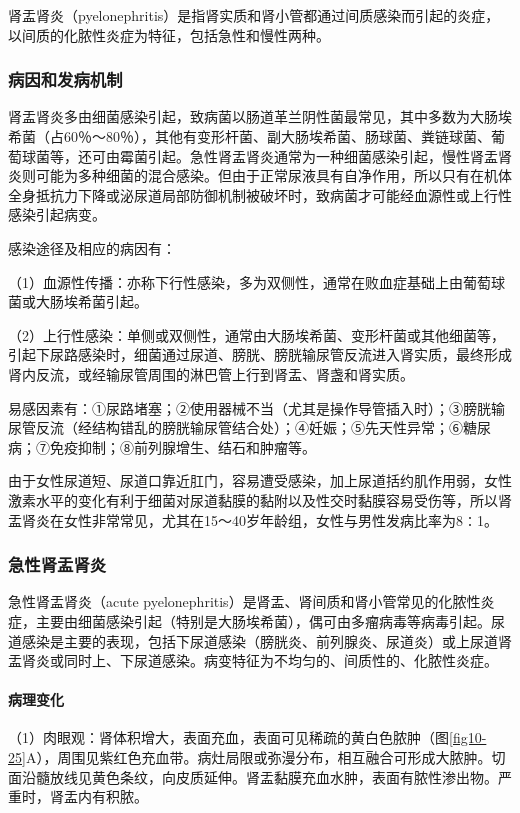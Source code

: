肾盂肾炎（pyelonephritis）是指肾实质和肾小管都通过间质感染而引起的炎症，以间质的化脓性炎症为特征，包括急性和慢性两种。

\subsubsection{病因和发病机制}

肾盂肾炎多由细菌感染引起，致病菌以肠道革兰阴性菌最常见，其中多数为大肠埃希菌（占60％～80％），其他有变形杆菌、副大肠埃希菌、肠球菌、粪链球菌、葡萄球菌等，还可由霉菌引起。急性肾盂肾炎通常为一种细菌感染引起，慢性肾盂肾炎则可能为多种细菌的混合感染。但由于正常尿液具有自净作用，所以只有在机体全身抵抗力下降或泌尿道局部防御机制被破坏时，致病菌才可能经血源性或上行性感染引起病变。

感染途径及相应的病因有：

（1）血源性传播：亦称下行性感染，多为双侧性，通常在败血症基础上由葡萄球菌或大肠埃希菌引起。

（2）上行性感染：单侧或双侧性，通常由大肠埃希菌、变形杆菌或其他细菌等，引起下尿路感染时，细菌通过尿道、膀胱、膀胱输尿管反流进入肾实质，最终形成肾内反流，或经输尿管周围的淋巴管上行到肾盂、肾盏和肾实质。

易感因素有：①尿路堵塞；②使用器械不当（尤其是操作导管插入时）；③膀胱输尿管反流（经结构错乱的膀胱输尿管结合处）；④妊娠；⑤先天性异常；⑥糖尿病；⑦免疫抑制；⑧前列腺增生、结石和肿瘤等。

由于女性尿道短、尿道口靠近肛门，容易遭受感染，加上尿道括约肌作用弱，女性激素水平的变化有利于细菌对尿道黏膜的黏附以及性交时黏膜容易受伤等，所以肾盂肾炎在女性非常常见，尤其在15～40岁年龄组，女性与男性发病比率为8∶1。

\subsubsection{急性肾盂肾炎}

急性肾盂肾炎（acute
pyelonephritis）是肾盂、肾间质和肾小管常见的化脓性炎症，主要由细菌感染引起（特别是大肠埃希菌），偶可由多瘤病毒等病毒引起。尿道感染是主要的表现，包括下尿道感染（膀胱炎、前列腺炎、尿道炎）或上尿道肾盂肾炎或同时上、下尿道感染。病变特征为不均匀的、间质性的、化脓性炎症。

\paragraph{病理变化}
（1）肉眼观：肾体积增大，表面充血，表面可见稀疏的黄白色脓肿（图\ref{fig10-25}A），周围见紫红色充血带。病灶局限或弥漫分布，相互融合可形成大脓肿。切面沿髓放线见黄色条纹，向皮质延伸。肾盂黏膜充血水肿，表面有脓性渗出物。严重时，肾盂内有积脓。

